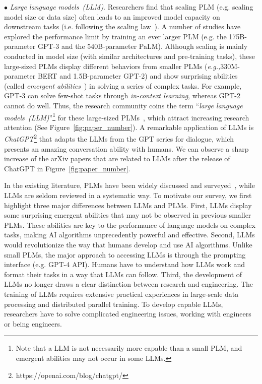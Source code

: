 $\bullet$ \emph{Large language models~(LLM)}. Researchers find that scaling PLM (e.g. scaling model size or data size)  often leads to an improved model capacity on downstream tasks (i.e. following the scaling law~\cite{Kaplan-arxiv-2020-Scaling}). A number of studies have explored the performance limit by training an ever larger PLM (e.g. the 175B-parameter GPT-3 and the 540B-parameter PaLM). Although scaling is mainly conducted in model size (with similar architectures and pre-training tasks), these large-sized PLMs display different behaviors from smaller PLMs (\emph{e.g.,}330M-parameter BERT and 1.5B-parameter GPT-2) and show surprising abilities (called \emph{emergent abilities}~\cite{Wei-arxiv-2022-Emergent}) in solving a series of complex tasks. For example, GPT-3 can  solve few-shot tasks through \emph{in-context learning}, whereas GPT-2 cannot do well. Thus, the research community coins the  term  ``\emph{large language models~(LLM)}''\footnote{Note that a LLM is not necessarily more capable than a small PLM, and  emergent abilities may not  occur in some LLMs. } for these large-sized PLMs~\cite{Shanahan-arxiv-2022-Talking,Wei-arxiv-2022-chain,Hoffmann-arxiv-2022-Training,Taylor-arxiv-2022-Galactica}, which attract  increasing   research attention (See Figure~\ref{fig:paper_number}). 
A remarkable application of LLMs is \emph{ChatGPT}\footnote{https://openai.com/blog/chatgpt/}  that adapts the LLMs from the GPT series for dialogue, which presents an amazing conversation ability with humans. We can observe a sharp increase of the  arXiv papers that are related to LLMs after the release of ChatGPT in Figure~\ref{fig:paper_number}.

In the existing literature, PLMs have been widely discussed and surveyed~\cite{Liu-survey-2023-Pre-train,Zhou-arxiv-2023-A,Han-AIopen-2021-PTM,qiu-CoRR-2020-PTM}, while LLMs are seldom reviewed in a systematic way. To  motivate our survey, we first highlight three major differences between LLMs and PLMs. First, LLMs display some surprising emergent abilities that may not be observed in previous smaller  PLMs. These abilities are key to the performance of language models on complex tasks, making AI algorithms unprecedently powerful and effective. Second, LLMs would  revolutionize  the way that humans  develop and use AI algorithms. Unlike small PLMs, the major approach to accessing LLMs is  through the prompting interface (e.g. GPT-4 API). Humans have to understand how LLMs work and format their tasks in a way that LLMs can follow. Third, the development of LLMs no longer draws a clear distinction between research and engineering. The training of LLMs requires extensive  practical experiences in large-scale data processing and distributed parallel training. To develop capable LLMs, researchers have to solve complicated engineering issues, working with engineers or being engineers. 

